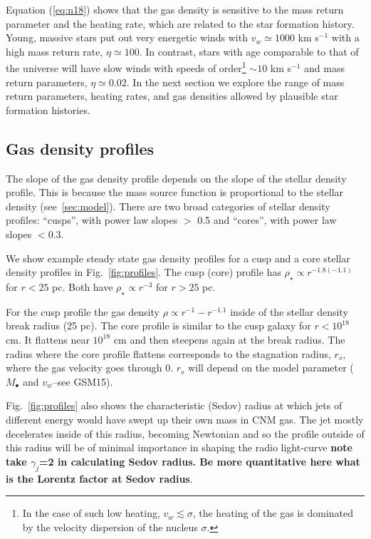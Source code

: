 \documentclass[usenatbib,fleqn]{mnras}
\newcommand{\Mbh}[1][]{M_{\bullet#1}}
\begin{document}
Equation (\ref{eq:n18}) shows that the gas density is sensitive to the
mass return parameter and the heating rate, which are related to the
star formation history. Young, massive stars put out very energetic
winds with $v_w\simeq 1000$ km s$^{-1}$ with a high mass return rate,
$\eta\simeq 100$.  In contrast, stars with age comparable to that of
the universe will have slow winds with speeds of order\footnote{In the
  case of such low heating, $v_w \lesssim \sigma$, the heating of the
  gas is dominated by the velocity dispersion of the nucleus
  $\sigma$.} $\sim 10$ km s$^{-1}$ and mass return parameters,
$\eta\simeq0.02$. In the next section we explore the range of mass
return parameters, heating rates, and gas densities allowed by
plausible star formation histories.

\subsection{Gas density profiles}
The slope of the gas density profile depends on the slope of the
stellar density profile.  This is because the  mass source function is
proportional to the stellar density (see~\ref{sec:model}). There are
two broad categories of stellar density profiles: ``cusps'', with power
law slopes $>$ 0.5  and ``cores'', with power law slopes $<0.3$.

We show example steady state gas density profiles for a cusp and a
core stellar density profiles in Fig.~\ref{fig:profiles}. The cusp
(core) profile has $\rho_\star \propto r^{-1.8 (-1.1)}$ for $r < 25$
pc. Both have $\rho_\star \propto r^{-3}$ for $r > 25$ pc.

For the cusp profile the gas density $\rho \propto r^{-1}-r^{-1.1}$
inside of the stellar density break radius (25 pc).  The core profile
is similar to the cusp galaxy for $r<10^{18}$ cm. It flattens near
$10^{18}$ cm and then steepens again at the break radius. The radius
where the core profile flattens corresponds to the stagnation radius,
$r_s$, where the gas velocity goes through 0.  $r_s$ will depend on
the model parameter ($\Mbh$ and $v_w$--see GSM15).

Fig.~\ref{fig:profiles} also shows the characteristic (Sedov) radius
at which jets of different energy would have swept up their own mass
in CNM gas.  The jet mostly decelerates inside of this radius,
becoming Newtonian and so the profile outside of this radius will be
of minimal importance in shaping the radio light-curve {\bf note take
  $\gamma_j$=2 in calculating Sedov radius. Be more quantitative here
  what is the Lorentz factor at Sedov radius}.
\end{document}
